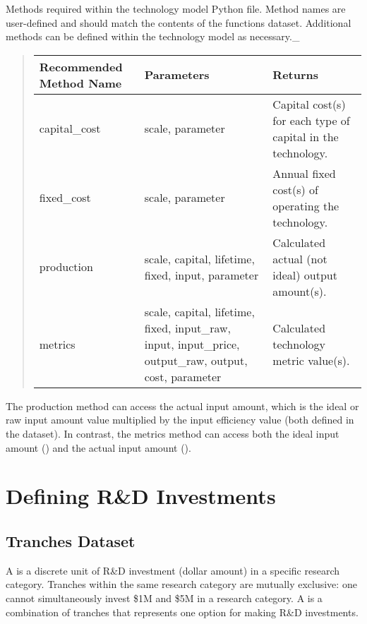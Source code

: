 \documentclass[letterpaper,10pt,english]{sphinxmanual}
\begin{document}
 Methods required within the technology model Python file. Method names are user-defined and should match the contents of the functions dataset. Additional methods can be defined within the technology model as necessary.\_
\begin{quote}


\begin{savenotes}\sphinxattablestart
\centering
\begin{tabulary}{\linewidth}[t]{|T|T|T|}
\hline
\sphinxstyletheadfamily 
Recommended Method Name
&\sphinxstyletheadfamily 
Parameters
&\sphinxstyletheadfamily 
Returns
\\
\hline
capital\_cost
&
scale, parameter
&
Capital cost(s) for each type of capital in the technology.
\\
\hline
fixed\_cost
&
scale, parameter
&
Annual fixed cost(s) of operating the technology.
\\
\hline
production
&
scale, capital, lifetime, fixed, input, parameter
&
Calculated actual (not ideal) output amount(s).
\\
\hline
metrics
&
scale, capital, lifetime, fixed, input\_raw, input, input\_price, output\_raw, output, cost, parameter
&
Calculated technology metric value(s).
\\
\hline
\end{tabulary}
\par
\sphinxattableend\end{savenotes}
\end{quote}

The production method can access the actual input amount, which is the ideal or raw input amount value multiplied by the input efficiency value (both defined in the  dataset). In contrast, the metrics method can access both the ideal input amount () and the actual input amount ().


\section{Defining R\&D Investments}
\label{\detokenize{cheat-sheet:defining-r-d-investments}}

\subsection{Tranches Dataset}
\label{\detokenize{cheat-sheet:tranches-dataset}}
A  is a discrete unit of R\&D investment (dollar amount) in a specific research category. Tranches within the same research category are mutually exclusive: one cannot simultaneously invest \$1M and \$5M in a research category. A  is a combination of tranches that represents one option for making R\&D investments.
\end{document}
